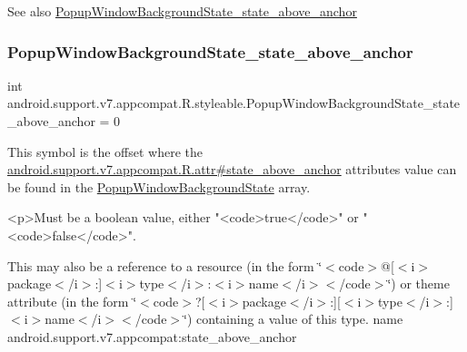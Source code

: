 \begin{DoxySeeAlso}{See also}
\hyperlink{classandroid_1_1support_1_1v7_1_1appcompat_1_1R_1_1styleable_a51c3c6df6f697d16ff02960ed889d6ad}{Popup\+Window\+Background\+State\+\_\+state\+\_\+above\+\_\+anchor} 
\end{DoxySeeAlso}
\mbox{\label{classandroid_1_1support_1_1v7_1_1appcompat_1_1R_1_1styleable_a51c3c6df6f697d16ff02960ed889d6ad}} 
\subsubsection{\texorpdfstring{Popup\+Window\+Background\+State\+\_\+state\+\_\+above\+\_\+anchor}{PopupWindowBackgroundState\_state\_above\_anchor}}
{\footnotesize\ttfamily int android.\+support.\+v7.\+appcompat.\+R.\+styleable.\+Popup\+Window\+Background\+State\+\_\+state\+\_\+above\+\_\+anchor = 0\hspace{0.3cm}{\ttfamily [static]}}

This symbol is the offset where the \hyperlink{classandroid_1_1support_1_1v7_1_1appcompat_1_1R_1_1attr_a2270d0961fce2e58048505a0cca06919}{android.\+support.\+v7.\+appcompat.\+R.\+attr\#state\+\_\+above\+\_\+anchor} attribute\textquotesingle{}s value can be found in the \hyperlink{classandroid_1_1support_1_1v7_1_1appcompat_1_1R_1_1styleable_af780db5a661b33d826f07231dfde13ec}{Popup\+Window\+Background\+State} array.

\begin{DoxyVerb}      <p>Must be a boolean value, either "<code>true</code>" or "<code>false</code>".
\end{DoxyVerb}
 

This may also be a reference to a resource (in the form \char`\"{}$<$code$>$@\mbox{[}$<$i$>$package$<$/i$>$\+:\mbox{]}$<$i$>$type$<$/i$>$\+:$<$i$>$name$<$/i$>$$<$/code$>$\char`\"{}) or theme attribute (in the form \char`\"{}$<$code$>$?\mbox{[}$<$i$>$package$<$/i$>$\+:\mbox{]}\mbox{[}$<$i$>$type$<$/i$>$\+:\mbox{]}$<$i$>$name$<$/i$>$$<$/code$>$\char`\"{}) containing a value of this type.  name android.\+support.\+v7.\+appcompat\+:state\+\_\+above\+\_\+anchor \mbox{\label{classandroid_1_1support_1_1v7_1_1appcompat_1_1R_1_1styleable_ae3744efe286beea8d85d9fa344fa70df}} 
